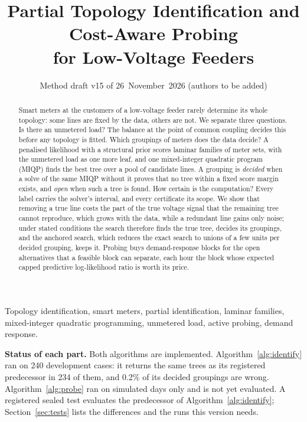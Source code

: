 \documentclass[journal,onecolumn,11pt]{IEEEtran}
\begin{document}
\title{Partial Topology Identification and Cost-Aware Probing\\ for Low-Voltage Feeders}
\author{Method draft v15 of 26~November~2026 (authors to be added)}
\maketitle

\begin{abstract}
Smart meters at the customers of a low-voltage feeder rarely determine its whole topology: some lines are fixed by the
data, others are not. We separate three questions. Is there an unmetered load? The balance at the point of common coupling
decides this before any topology is fitted. Which groupings of meters does the data decide? A penalised likelihood with a
structural prior scores laminar families of meter sets, with the unmetered load as one more leaf, and one mixed-integer
quadratic program (MIQP) finds the best tree over a pool of candidate lines. A grouping is \emph{decided} when a solve of the
same MIQP without it proves that no tree within a fixed score margin exists, and \emph{open} when such a tree is found. How
certain is the computation? Every label carries the solver's interval, and every certificate its scope. We show that
removing a true line costs the part of the true voltage signal that the remaining tree cannot reproduce, which grows with
the data, while a redundant line gains only noise; under stated conditions the search therefore finds the true tree,
decides its groupings, and the anchored search, which reduces the exact search to unions of a few units per decided
grouping, keeps it. Probing buys demand-response blocks for the open alternatives that a feasible block can separate, each hour the
block whose expected capped predictive log-likelihood ratio is worth its price.
\end{abstract}

\begin{IEEEkeywords}
Topology identification, smart meters, partial identification, laminar families, mixed-integer quadratic programming,
unmetered load, active probing, demand response.
\end{IEEEkeywords}

\noindent\textbf{Status of each part.} Both algorithms are implemented. Algorithm~\ref{alg:identify} ran on 240 development
cases: it returns the same trees as its registered predecessor in 234 of them, and 0.2\% of its decided groupings are wrong.
Algorithm~\ref{alg:probe} ran on simulated days only and is not yet evaluated. A registered sealed test evaluates the
predecessor of Algorithm~\ref{alg:identify}; Section~\ref{sec:tests} lists the differences and the runs this version needs.
\end{document}
